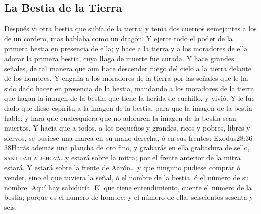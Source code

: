 \subsection*{La Bestia de la Tierra}
Después vi otra bestia que subía de la tierra; y tenía dos cuernos%
 semejantes a los de un cordero, mas hablaba como un dragón. 
Y ejerce todo el poder de la primera bestia en presencia de ella; y hace a la tierra y a los moradores de ella adorar la primera bestia, cuya llaga de muerte fue curada. 
Y hace grandes señales, de tal manera que aun hace descender fuego del cielo a la tierra delante de los hombres.%
Y engaña a los moradores de la tierra por las señales que le ha sido dado hacer en presencia de la bestia, mandando a los moradores de la tierra que hagan la imagen de la bestia que tiene la herida de cuchillo, y vivió. 
Y le fue dado que diese espíritu a la imagen de la bestia, para que la imagen de la bestia hable; y hará que cualesquiera que no adoraren la imagen de la bestia sean muertos.%
Y hacía que a todos, a los pequeños y grandes, ricos y pobres, libres y siervos, se pusiese una marca en su mano derecha, ó en sus frentes:%
				  {Exodus}{28:36-38}{Harás además una plancha de oro fino, y grabarás en ella grabadura de sello, \textsc{santidad a jehová}\ldots y estará sobre la mitra; por el frente anterior de la mitra estará. Y estará sobre la frente de Aarón\ldots}
y que ninguno pudiese comprar ó vender, sino el que tuviera la señal, ó el nombre de la bestia, ó el número de su nombre. 
Aquí hay sabiduría. El que tiene entendimiento, cuente el número de la bestia; porque es el número de hombre: y el número de ella, seiscientos sesenta y seis.
